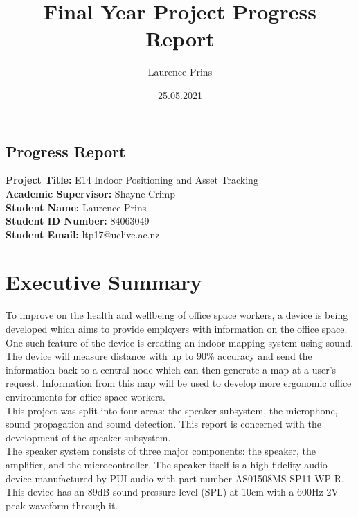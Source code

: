 \documentclass[12pt, a4paper]{article}
\title{Final Year Project Progress Report}
\author{Laurence Prins}
\date{25.05.2021}
\begin{document}
	\begin{center}
	\section*{\Huge Progress Report}
\end{center}

\vspace{60pt} \hfill {}

\noindent\textbf{Project Title:} E14 Indoor Positioning and Asset Tracking\\

\noindent\textbf{Academic Supervisor:} Shayne Crimp\\

\noindent\textbf{Student Name:} Laurence Prins\\

\noindent\textbf{Student ID Number:} 84063049\\

\noindent\textbf{Student Email:} ltp17@uclive.ac.nz\\

\pagebreak

\maketitle 

\pagebreak
{}
\section{Executive Summary}
To improve on the health and wellbeing of office space workers, a device is being developed which aims to provide employers with information on the office space. One such feature of the device is creating an indoor mapping system using sound. \\

The device will measure distance with up to 90\% accuracy and send the information back to a central node which can then generate a map at a user's request. Information from this map will be used to develop more ergonomic office environments for office space workers. \\

This project was split into four areas: the speaker subsystem, the microphone, sound propagation and sound detection. This report is concerned with the development of the speaker subsystem. \\

The speaker system consists of three major components: the speaker, the amplifier, and the microcontroller. The speaker itself is a high-fidelity audio device manufactured by PUI audio with part number AS01508MS-SP11-WP-R. This device has an 89dB sound pressure level (SPL) at 10cm with a 600Hz 2V peak waveform through it. \\
\end{document}
